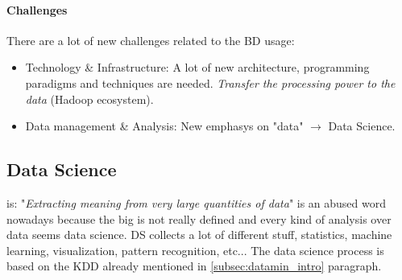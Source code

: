 \documentclass[12pt]{article}
\begin{document}
\paragraph{Challenges} There are a lot of new challenges related to the BD usage:
\begin{itemize}
  \item Technology \& Infrastructure: A lot of new architecture, programming paradigms and techniques are needed. \textit{Transfer the processing power to the data} (Hadoop ecosystem).
  \item Data management \& Analysis: New emphasys on "data" $\rightarrow$ Data Science.
\end{itemize}

\subsection{Data Science} is: "\textit{Extracting meaning from very large quantities of data}" is an abused word nowadays because the big is not really defined and every kind of analysis over data seems data science. DS collects a lot of different stuff, statistics, machine learning, visualization, pattern recognition, etc... The data science process is based on the KDD already mentioned in \ref{subsec:datamin_intro} paragraph.
\end{document}

